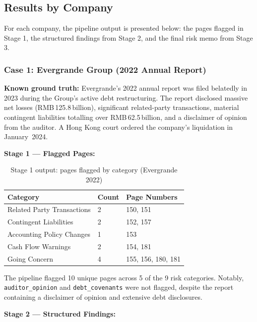 \documentclass[12pt,a4paper]{article}
\begin{document}
\subsection{Results by Company}

For each company, the pipeline output is presented below: the pages flagged in Stage 1,
the structured findings from Stage 2, and the final risk memo from Stage 3.

\subsubsection{Case 1: Evergrande Group (2022 Annual Report)}

\textbf{Known ground truth:} Evergrande's 2022 annual report was filed
belatedly in 2023 during the Group's active debt restructuring. The report
disclosed massive net losses (RMB\,125.8\,billion), significant related-party
transactions, material contingent liabilities totalling over RMB\,62.5\,billion,
and a disclaimer of opinion from the auditor. A Hong Kong court ordered the
company's liquidation in January~2024.

\textbf{Stage 1 --- Flagged Pages:}

\begin{table}[H]
\centering
\begin{tabular}{p{4.5cm} p{1.5cm} p{5cm}}
\toprule
\textbf{Category} & \textbf{Count} & \textbf{Page Numbers} \\
\midrule
Related Party Transactions & 2 & 150, 151 \\
Contingent Liabilities & 2 & 152, 157 \\
Accounting Policy Changes & 1 & 153 \\
Cash Flow Warnings & 2 & 154, 181 \\
Going Concern & 4 & 155, 156, 180, 181 \\
\bottomrule
\end{tabular}
\caption{Stage 1 output: pages flagged by category (Evergrande 2022)}
\end{table}

\noindent The pipeline flagged 10 unique pages across 5 of the 9 risk categories.
Notably, \texttt{auditor\_opinion} and \texttt{debt\_covenants} were not flagged,
despite the report containing a disclaimer of opinion and extensive debt disclosures.

\textbf{Stage 2 --- Structured Findings:}
\end{document}
